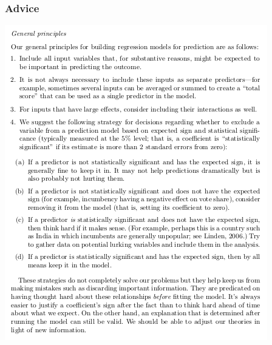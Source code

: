 \documentclass{beamer}
\begin{document}
\begin{frame}
  \frametitle{Advice}
  \includegraphics[width=\textwidth,height=0.8\textheight,keepaspectratio=true]{advice}
\end{frame}


%
\end{document}
